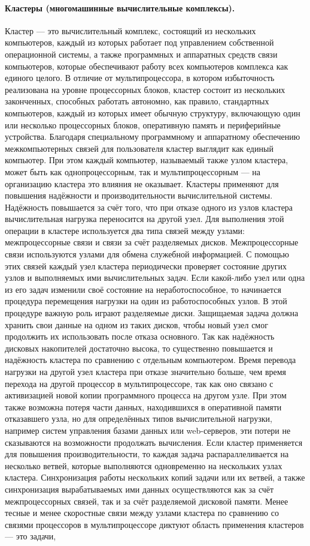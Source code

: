 \documentclass[a4paper,12pt]{article}
\begin{document}
\paragraph{Кластеры (многомашинные вычислительные комплексы).}
Кластер — это вычислительный комплекс, состоящий из нескольких компьютеров, каждый из которых работает под управлением собственной операционной системы, а также программных и аппаратных средств связи компьютеров, которые обеспечивают работу всех компьютеров комплекса как единого целого. В отличие от мультипроцессора, в котором избыточность реализована на уровне процессорных блоков, кластер состоит из нескольких законченных, способных работать автономно, как правило, стандартных компьютеров, каждый из которых имеет обычную структуру, включающую один или несколько процессорных блоков, оперативную память и периферийные устройства. Благодаря специальному программному и аппаратному обеспечению межкомпьютерных связей для пользователя кластер выглядит как единый компьютер. При этом каждый компьютер, называемый также узлом кластера, может быть как однопроцессорным, так и мультипроцессорным — на организацию кластера это влияния не оказывает. Кластеры применяют для повышения надёжности и производительности вычислительной системы. Надёжность повышается за счёт того, что при отказе одного из узлов кластера вычислительная нагрузка переносится на другой узел. Для выполнения этой операции в кластере используется два типа связей между узлами: межпроцессорные связи и связи за счёт разделяемых дисков. Межпроцессорные связи используются узлами для обмена служебной информацией. С помощью этих связей каждый узел кластера периодически проверяет состояние других узлов и выполняемых ими вычислительных задач. Если какой-либо узел или одна из его задач изменили своё состояние на неработоспособное, то начинается процедура перемещения нагрузки на один из работоспособных узлов. В этой процедуре важную роль играют разделяемые диски. Защищаемая задача должна хранить свои данные на одном из таких дисков, чтобы новый узел смог продолжить их использовать после отказа основного. Так как надёжность дисковых накопителей достаточно высока, то существенно повышается и надёжность кластера по сравнению с отдельным компьютером. Время перевода нагрузки на другой узел кластера при отказе значительно больше, чем время перехода на другой процессор в мультипроцессоре, так как оно связано с активизацией новой копии программного процесса на другом узле. При этом также возможна потеря части данных, находившихся в оперативной памяти отказавшего узла, но для определённых типов вычислительной нагрузки, например систем управления базами данных или web-серверов, эти потери не сказываются на возможности продолжать вычисления. Если кластер применяется для повышения производительности, то каждая задача распараллеливается на несколько ветвей, которые выполняются одновременно на нескольких узлах кластера. Синхронизация работы нескольких копий задачи или их ветвей, а также синхронизация вырабатываемых ими данных осуществляются как за счёт межпроцессорных связей, так и за счёт разделяемой дисковой памяти. Менее тесные и менее скоростные связи между узлами кластера по сравнению со связями процессоров в мультипроцессоре диктуют область применения кластеров — это задачи, 
\end{document}
